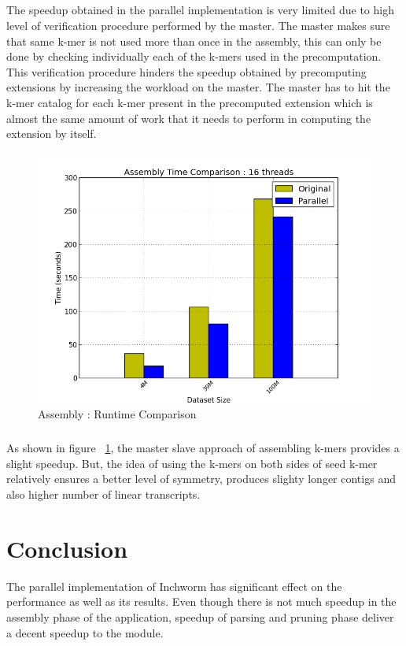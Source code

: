 \label{key}\documentclass[bachinf, english ,zihtitle,final,hyperref,utf8]{zihpub}
\begin{document}
\paragraph{}
The speedup obtained in the parallel implementation is very limited due to high level of verification procedure performed by the master. The master makes sure that same k-mer is not used more than once in the assembly, this can only be done by checking individually each of the k-mers used in the precomputation. This verification procedure hinders the speedup obtained by precomputing extensions by increasing the workload on the master. The master has to hit the k-mer catalog for each k-mer present in the precomputed extension which is almost the same amount of work that it needs to perform in computing the extension by 
itself.
\begin{figure}[h]
\center
\includegraphics[scale=0.45]{compare-assembly}
\caption{Assembly : Runtime Comparison}
\label{assembly-compare}
\end{figure}
\paragraph{}
As shown in figure ~\ref{assembly-compare}, the master slave approach of assembling k-mers provides a slight speedup. But, the idea of using the k-mers on both sides of seed k-mer relatively ensures a better level of symmetry, produces slighty longer contigs and also higher number of linear transcripts. 
\newpage
\newpage
\chapter{Conclusion}
The parallel implementation of Inchworm has significant effect on the performance as well as its results. Even though there is not much speedup in the assembly phase of the application, speedup of parsing and pruning phase deliver a decent speedup to the module.
\end{document}
